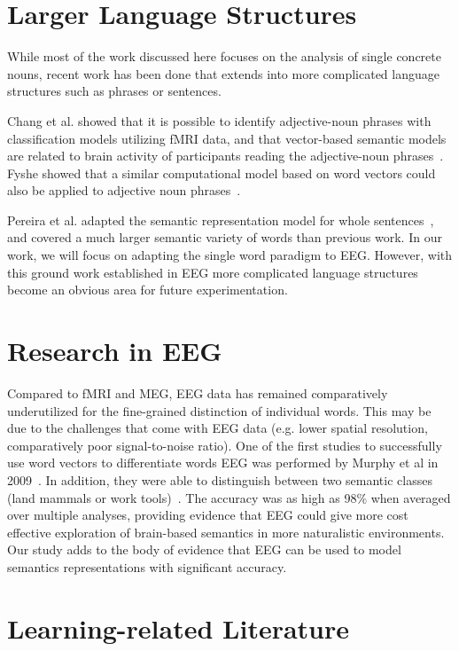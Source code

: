 \section{Larger Language Structures}

While most of the work discussed here focuses on the analysis of single 
concrete nouns, recent work has been done that extends into more complicated 
language structures such as phrases or sentences. 

Chang et al. showed that it is possible to identify adjective-noun phrases with 
classification models utilizing fMRI data, and that vector-based semantic 
models are related to brain activity of participants reading the adjective-noun 
phrases~\cite{Change2009}. Fyshe showed that a similar computational model 
based on word vectors could also be applied to adjective noun 
phrases~\cite{afyshethesis}.

Pereira et al. adapted the semantic representation model for whole 
sentences~\cite{pereira2018toward}, and covered a much larger semantic variety 
of words than previous work. In our work, we will focus on adapting the single 
word paradigm to EEG. However, with this ground work established in EEG more 
complicated language structures become an obvious area for future 
experimentation.

\section{Research in EEG}

Compared to fMRI and MEG, EEG data has remained comparatively underutilized for 
the fine-grained distinction of individual words. This may be due to the 
challenges that come with EEG data (e.g. lower spatial resolution, 
comparatively poor signal-to-noise ratio).  One of the first studies to 
successfully use word vectors to differentiate words EEG was performed by 
Murphy et al in 2009~\cite{Murphy2009}. In addition, they were able to 
distinguish between two semantic classes (land mammals or work 
tools)~\cite{Murphy2009,Murphy2011}. The accuracy was as high as 98\% when 
averaged over multiple analyses, providing evidence that EEG could give more 
cost effective exploration of brain-based semantics in more naturalistic 
environments.  Our study adds to the body of evidence that EEG can be used to 
model semantics representations with significant accuracy.

\section{Learning-related Literature}

